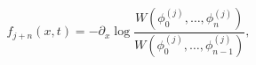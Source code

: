 \begin{equation}\label{crum2}
f_{j+n}(x,t)=-\partial_x\log \frac{W\left(\phi_0^{(j)},\dots,
\phi_n^{(j)}\right)}{W\left(\phi_0^{(j)},\dots,\phi_{n-1}^{(j)}\right)},
\end{equation}


